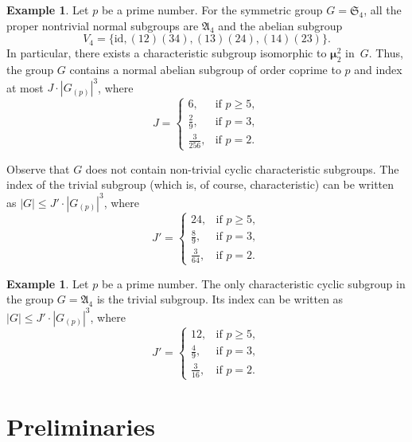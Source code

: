 \documentclass[12pt]{amsart}
\numberwithin{equation}{section}
\theoremstyle{definition}
\newtheorem{example}[subsection]{Example}
\newcommand{\mumu}{\boldsymbol{\mu}}
\def \ge {\geqslant}
\def \le {\leqslant}
\begin{document}
\begin{example}
\label{example:S4}
Let $p$ be a prime number.
For the symmetric group $G=\mathfrak{S}_4$,
all the proper nontrivial normal subgroups are $\mathfrak{A}_4$ and the abelian subgroup
$$
V_4=\{\mathrm{id},(12)(34),(13)(24),(14)(23)\}.
$$
In particular, there exists a characteristic subgroup isomorphic to $\mumu_2^2$ in~$G$.
Thus, the group $G$ contains a normal abelian
subgroup of order coprime to $p$ and index at most $J\cdot |G_{(p)}|^3$, where
\begin{equation*}
J=\begin{cases}
6, &\text{if\ } p\ge 5,\\
\frac{2}{9}, &\text{if\ } p=3,\\
\frac{3}{256}, &\text{if\ } p=2.
\end{cases}
\end{equation*}

Observe that $G$ does not contain non-trivial cyclic characteristic subgroups.
The index of the trivial subgroup (which is, of course, characteristic) can be written as
$|G|\le J'\cdot |G_{(p)}|^3$, where
\begin{equation*}%
J'=\begin{cases}
24, &\text{if\ } p\ge 5,\\
\frac{8}{9}, &\text{if\ } p=3,\\
\frac{3}{64}, &\text{if\ } p=2.
\end{cases}
\end{equation*}
\end{example}

\begin{example}
\label{example:A4}
Let $p$ be a prime number. The only characteristic cyclic subgroup
in the group $G=\mathfrak{A}_4$ is the trivial subgroup.
Its index can be written as~\mbox{$|G|\le J'\cdot |G_{(p)}|^3$}, where
\begin{equation*}%
J'=\begin{cases}
12, &\text{if\ } p\ge 5,\\
\frac{4}{9}, &\text{if\ } p=3,\\
\frac{3}{16}, &\text{if\ } p=2.
\end{cases}
\end{equation*}
\end{example}




\section{Preliminaries}
\label{section:preliminaries}
\end{document}
